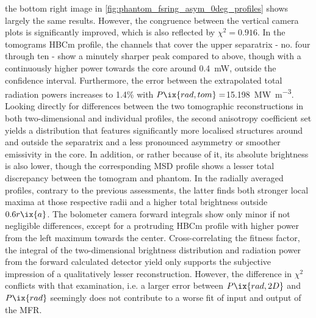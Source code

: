 the bottom right image in \cref{fig:phantom_fsring_asym_0deg_profiles} shows largely the same results. However, the congruence between the vertical camera plots is significantly improved, which is also reflected by $\chi^{2}=0.916$. In the tomograms HBCm profile, the channels that cover the upper separatrix - no. four through ten - show a minutely sharper peak compared to above, though with a continuously higher power towards the core around \SI{0.4}{\milli\watt}, outside the confidence interval. Furthermore, the error between the extrapolated total radiation powers increases to 1.4\% with $P\ix{rad,tom}=$\SI{15.198}{\mega\watt\per\cubic\meter}.\\%
                Looking directly for differences between the two tomographic reconstructions in both two-dimensional and individual profiles, the second anisotropy coefficient set yields a distribution that features significantly more localised structures around and outside the separatrix and a less pronounced asymmetry or smoother emissivity in the core. In addition, or rather because of it, its absolute brightness is also lower, though the corresponding MSD profile shows a lesser total discrepancy between the tomogram and phantom. In the radially averaged profiles, contrary to the previous assessments, the latter finds both stronger local maxima at those respective radii and a higher total brightness outside $0.6r\ix{a}$. The bolometer camera forward integrals show only minor if not negligible differences, except for a protruding HBCm profile with higher power from the left maximum towards the center. Cross-correlating the fitness factor, the integral of the two-dimensional brightness distribution and radiation power from the forward calculated detector yield only supports the subjective impression of a qualitatively lesser reconstruction. However, the difference in $\chi^{2}$ conflicts with that examination, i.e. a larger error between $P\ix{rad,2D}$ and $P\ix{rad}$ seemingly does not contribute to a worse fit of input and output of the MFR.\\%
